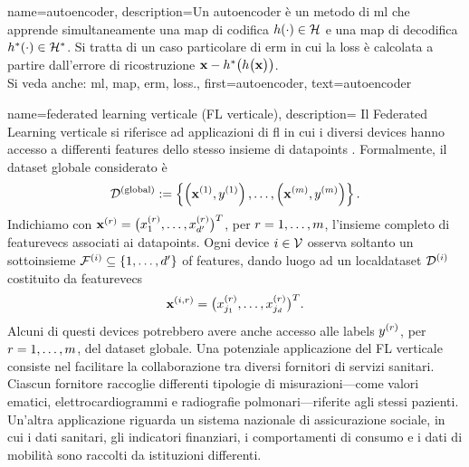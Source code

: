 {name={autoencoder},
	description={Un autoencoder è un metodo di \gls{ml} che apprende simultaneamente una \gls{map} di codifica
		$h(\cdot) \in \mathcal{H}$ e una \gls{map} di decodifica $h^{*}(\cdot) \in \mathcal{H}^{*}$. 
		Si tratta di un caso particolare di \gls{erm} in cui la \gls{loss} è calcolata a partire dall'errore di ricostruzione
		${\bf x} - h^{*}\big(  h \big( {\bf x} \big) \big)$.
					\\ 
		Si veda anche: \gls{ml}, \gls{map}, \gls{erm}, \gls{loss}.},
	first={autoencoder},
	text={autoencoder}
} 

{name={federated learning verticale (FL verticale)},
	description={
		Il Federated Learning verticale si riferisce ad applicazioni di \gls{fl} 
		in cui i diversi \glspl{device} hanno accesso a differenti \glspl{feature} dello stesso insieme di
		\glspl{datapoint} \cite{VFLChapter}. 
		Formalmente, il \gls{dataset} globale considerato è
		\[
		\mathcal{D}^{(\mathrm{global})} := \left\{ \left({\bf x}^{(1)}, y^{(1)}\right), \ldots, \left({\bf x}^{(m)}, y^{(m)}\right) \right\}.
		\]
		Indichiamo con ${\bf x}^{(r)} = \big( x^{(r)}_{1}, \ldots, x^{(r)}_{d'} \big)^{T}$, per $r=1,\ldots,m$, 
	     	l'insieme completo di \glspl{featurevec} associati ai \glspl{datapoint}. Ogni \gls{device} $i \in \mathcal{V}$ 
		osserva soltanto un sottoinsieme $\mathcal{F}^{(i)} \subseteq \{1,\ldots,d'\}$ of \glspl{feature}, dando 
		luogo ad un \gls{localdataset} $\mathcal{D}^{(i)}$ costituito da \glspl{featurevec}
		\[
		{\bf x}^{(i,r)} = \big( x^{(r)}_{j_{1}}, \ldots, x^{(r)}_{j_{d}} \big)^{T}.
		\]
		Alcuni di questi \glspl{device} potrebbero avere anche accesso alle \glspl{label} $y^{(r)}$, per $r=1,\ldots,m$, 
		del \gls{dataset} globale. Una potenziale applicazione del FL verticale consiste nel facilitare la 
		collaborazione tra diversi fornitori di servizi sanitari. Ciascun fornitore raccoglie differenti tipologie di 
		misurazioni—come valori ematici, elettrocardiogrammi e radiografie polmonari—riferite agli stessi pazienti. 
		Un'altra applicazione riguarda un sistema nazionale di assicurazione sociale, in cui i dati sanitari, 
		gli indicatori finanziari, i comportamenti di consumo e i dati di mobilità sono raccolti da istituzioni differenti. 
}}
